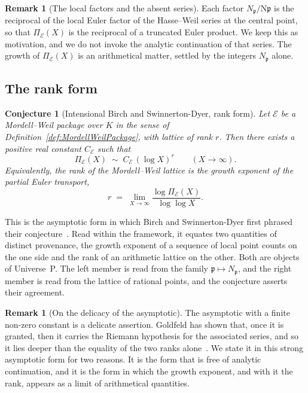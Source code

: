 \documentclass[10pt, reqno]{amsart}
\theoremstyle{plain}
\theoremstyle{definition}
\newtheorem{remark}[theorem]{Remark}
\theoremstyle{plain}
\newtheorem{conjecture}[theorem]{Conjecture}
\begin{document}
\begin{remark}[The local factors and the absent series]\label{rem:EulerFactorMotivation}
Each factor $N_{\mathfrak{p}}/\mathrm{N}\mathfrak{p}$ is the reciprocal of the local Euler factor of the Hasse--Weil series at the central point, so that $\Pi_{\mathcal{E}}(X)$ is the reciprocal of a truncated Euler product. We keep this as motivation, and we do not invoke the analytic continuation of that series. The growth of $\Pi_{\mathcal{E}}(X)$ is an arithmetical matter, settled by the integers $N_{\mathfrak{p}}$ alone.
\end{remark}

\subsection{The rank form}\label{subsec:BSDRank}

\begin{conjecture}[Intensional Birch and Swinnerton-Dyer, rank
form]\label{conjecture:IntensionalBSDRank} Let $\mathcal{E}$ be a Mordell--Weil package over $K$ in the sense of Definition~\ref{def:MordellWeilPackage}, with lattice of rank $r$. Then there exists a positive real constant $C_{\mathcal{E}}$ such that
\[
  \Pi_{\mathcal{E}}(X) \;\sim\; C_{\mathcal{E}} \, (\log X)^{r}
  \qquad (X \to \infty).
\]
Equivalently, the rank of the Mordell--Weil lattice is the growth exponent of the partial Euler transport,
\[
  r \;=\; \lim_{X \to \infty} \frac{\log \Pi_{\mathcal{E}}(X)}{\log \log X}.
\]
\end{conjecture}

This is the asymptotic form in which Birch and Swinnerton-Dyer first phrased their conjecture~\cite{Birch1965}. Read within the framework, it equates two quantities of distinct provenance, the growth exponent of a sequence of local point counts on the one side and the rank of an arithmetic lattice on the other. Both are objects of Universe~P. The left member is read from the family $\mathfrak{p} \mapsto N_{\mathfrak{p}}$, and the right member is read from the lattice of rational points, and the conjecture asserts their agreement.

\begin{remark}[On the delicacy of the asymptotic]\label{rem:RankSubtlety}
The asymptotic with a finite non-zero constant is a delicate assertion. Goldfeld has shown that, once it is granted, then it carries the Riemann hypothesis for the associated series, and so it lies deeper than the equality of the two ranks alone~\cite{Goldfeld1982}. We state it in this strong asymptotic form for two reasons. It is the form that is free of analytic continuation, and it is the form in which the growth exponent, and with it the rank, appears as a limit of arithmetical quantities.
\end{remark}
\end{document}
